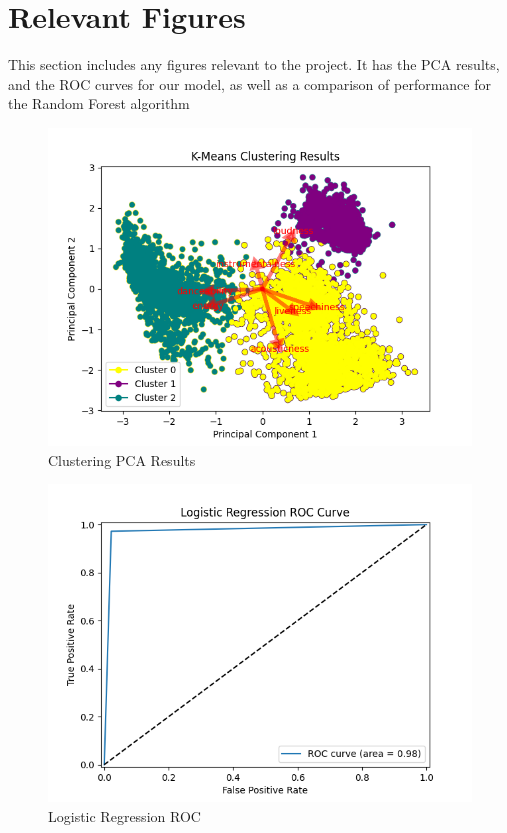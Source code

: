 \section{Relevant Figures}

This section includes any figures relevant to the project. It has the PCA results, and the ROC curves for our model, as well as a comparison of performance for the Random Forest algorithm

\begin{figure}[H] %
    \centering
    \includegraphics[width=0.75\linewidth]{figs/kmeanscluster.png}
    \caption{Clustering PCA Results}
    \vspace{-8mm}
\end{figure}


\begin{figure}[H] %
    \centering
    \includegraphics[width=0.75\linewidth]{figs/logistic-regressionROC.png}
    \caption{Logistic Regression ROC}
    \vspace{-8mm}
\end{figure}

